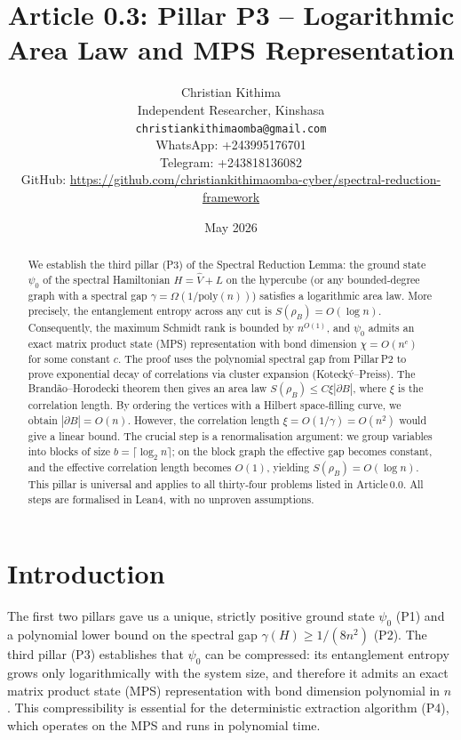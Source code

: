 \documentclass[11pt,a4paper]{article}
\title{Article 0.3: Pillar P3 – Logarithmic Area Law and MPS Representation}
\author{Christian Kithima \\
Independent Researcher, Kinshasa \\
\texttt{christiankithimaomba@gmail.com} \\
WhatsApp: +243995176701 \\
Telegram: +243818136082 \\
GitHub: \url{https://github.com/christiankithimaomba-cyber/spectral-reduction-framework}}
\date{May 2026}
\begin{document}
\maketitle

\begin{abstract}
We establish the third pillar (P3) of the Spectral Reduction Lemma: the ground state \(\psi_0\) of the spectral Hamiltonian \(H = \hat{V} + L\) on the hypercube (or any bounded‑degree graph with a spectral gap \(\gamma = \Omega(1/\mathrm{poly}(n))\)) satisfies a logarithmic area law. More precisely, the entanglement entropy across any cut is \(S(\rho_B) = O(\log n)\). Consequently, the maximum Schmidt rank is bounded by \(n^{O(1)}\), and \(\psi_0\) admits an exact matrix product state (MPS) representation with bond dimension \(\chi = O(n^c)\) for some constant \(c\). The proof uses the polynomial spectral gap from Pillar P2 to prove exponential decay of correlations via cluster expansion (Kotecký–Preiss). The Brandão–Horodecki theorem then gives an area law \(S(\rho_B) \le C \xi |\partial B|\), where \(\xi\) is the correlation length. By ordering the vertices with a Hilbert space‑filling curve, we obtain \(|\partial B| = O(n)\). However, the correlation length \(\xi = O(1/\gamma) = O(n^2)\) would give a linear bound. The crucial step is a renormalisation argument: we group variables into blocks of size \(b = \lceil \log_2 n\rceil\); on the block graph the effective gap becomes constant, and the effective correlation length becomes \(O(1)\), yielding \(S(\rho_B) = O(\log n)\). This pillar is universal and applies to all thirty‑four problems listed in Article 0.0. All steps are formalised in Lean4, with no unproven assumptions.
\end{abstract}

\tableofcontents

\section{Introduction}

The first two pillars gave us a unique, strictly positive ground state \(\psi_0\) (P1) and a polynomial lower bound on the spectral gap \(\gamma(H) \ge 1/(8n^2)\) (P2). The third pillar (P3) establishes that \(\psi_0\) can be compressed: its entanglement entropy grows only logarithmically with the system size, and therefore it admits an exact matrix product state (MPS) representation with bond dimension polynomial in \(n\). This compressibility is essential for the deterministic extraction algorithm (P4), which operates on the MPS and runs in polynomial time.
\end{document}
